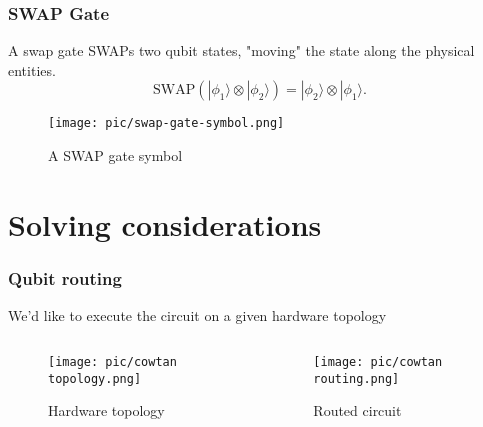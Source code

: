 \documentclass[lualatex,compress,12pt]{beamer}
\begin{document}
\begin{frame}
	\frametitle{SWAP Gate}
	
	A swap gate SWAPs two qubit states, "moving" the state along the physical entities.
	\[
	\text{SWAP} (|\phi_{1}\rangle \otimes |\phi_{2}\rangle) = |\phi_{2}\rangle \otimes |\phi_{1}\rangle.
	\]
	\begin{figure}
		\texttt{[image: pic/swap-gate-symbol.png]}
		\caption{A SWAP gate symbol \parencite{bergholmPennyLaneAutomaticDifferentiation2022}}
	\end{figure}
	
\end{frame}



\section{Solving considerations}

\begin{frame}
	\frametitle{Qubit routing}
	

	We'd like to execute the circuit on a given hardware topology
	\begin{columns}[b]
		\begin{column}{.5\textwidth}
			\begin{figure}
				\centering
				\texttt{[image: pic/cowtan topology.png]}
				\caption{Hardware topology}
			\end{figure}      
		\end{column}
		\begin{column}{.5\textwidth}
			\begin{figure}
				\centering
				\texttt{[image: pic/cowtan routing.png]}
				\caption{Routed circuit \parencite{cowtanQubitRoutingProblem2019}}
			\end{figure}
		\end{column}
	\end{columns}
	


	
	
	
\end{frame}	
\end{document}
